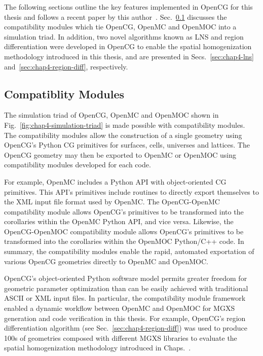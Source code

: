 The following sections outline the key features implemented in OpenCG for this thesis and follows a recent paper by this author~\cite{boyd2015opencg}. Sec.~\ref{sec:chap4-opencg-compatibility} discusses the compatibility modules which tie OpenCG, OpenMC and OpenMOC into a simulation triad. In addition, two novel algorithms known as \ac{LNS} and region differentiation were developed in OpenCG to enable the spatial homogenization methodology introduced in this thesis, and are presented in Secs.~\ref{sec:chap4-lns} and~\ref{sec:chap4-region-diff}, respectively.

\subsection{Compatiblity Modules}
\label{sec:chap4-opencg-compatibility}

The simulation triad of OpenCG, OpenMC and OpenMOC shown in Fig.~\ref{fig:chap4-simulation-triad} is made possible with compatibility modules. The compatibility modules allow the construction of a single geometry using OpenCG's Python \ac{CG} primitives for surfaces, cells, universes and lattices. The OpenCG geometry may then be exported to OpenMC or OpenMOC using compatibility modules developed for each code.

For example, OpenMC includes a Python \ac{API} with object-oriented \ac{CG} primitives. This \ac{API}'s primitives include routines to directly export themselves to the \ac{XML} input file format used by OpenMC. The OpenCG-OpenMC compatibility module allows OpenCG's primitives to be transformed into the corollaries within the OpenMC Python \ac{API}, and vice versa. Likewise, the OpenCG-OpenMOC compatibility module allows OpenCG's primitives to be transformed into the corollaries within the OpenMOC Python/C++ code. In summary, the compatibility modules enable the rapid, automated exportation of various OpenCG geometries directly to OpenMC and OpenMOC.

OpenCG's object-oriented Python software model permits greater freedom for geometric parameter optimization than can be easily achieved with traditional \ac{ASCII} or \ac{XML} input files. In particular, the compatibility module framework enabled a dynamic workflow between OpenMC and OpenMOC for \ac{MGXS} generation and code verification in this thesis. For example, OpenCG's region differentiation algorithm (see Sec.~\ref{sec:chap4-region-diff}) was used to produce 100s of geometries composed with different \ac{MGXS} libraries to evaluate the spatial homogenization methodology introduced in Chaps.~.

